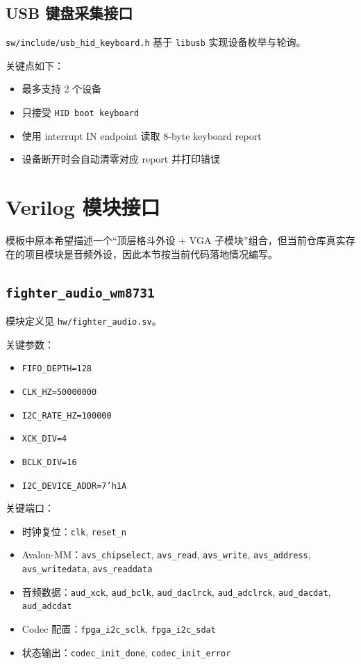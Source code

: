 \documentclass[12pt,a4paper]{ctexart}
\begin{document}
\subsection{USB 键盘采集接口}

\texttt{sw/include/usb\_hid\_keyboard.h} 基于 \texttt{libusb} 实现设备枚举与轮询。

关键点如下：

\begin{itemize}
  \item 最多支持 2 个设备
  \item 只接受 \texttt{HID boot keyboard}
  \item 使用 interrupt IN endpoint 读取 8-byte keyboard report
  \item 设备断开时会自动清零对应 report 并打印错误
\end{itemize}

\section{Verilog 模块接口}

模板中原本希望描述一个“顶层格斗外设 + VGA 子模块”组合，但当前仓库真实存在的项目模块是音频外设，因此本节按当前代码落地情况编写。

\subsection{\texttt{fighter\_audio\_wm8731}}

模块定义见 \texttt{hw/fighter\_audio.sv}。

关键参数：

\begin{itemize}
  \item \texttt{FIFO\_DEPTH=128}
  \item \texttt{CLK\_HZ=50000000}
  \item \texttt{I2C\_RATE\_HZ=100000}
  \item \texttt{XCK\_DIV=4}
  \item \texttt{BCLK\_DIV=16}
  \item \texttt{I2C\_DEVICE\_ADDR=7'h1A}
\end{itemize}

关键端口：

\begin{itemize}
  \item 时钟复位：\texttt{clk}, \texttt{reset\_n}
  \item Avalon-MM：\texttt{avs\_chipselect}, \texttt{avs\_read}, \texttt{avs\_write}, \texttt{avs\_address}, \texttt{avs\_writedata}, \texttt{avs\_readdata}
  \item 音频数据：\texttt{aud\_xck}, \texttt{aud\_bclk}, \texttt{aud\_daclrck}, \texttt{aud\_adclrck}, \texttt{aud\_dacdat}, \texttt{aud\_adcdat}
  \item Codec 配置：\texttt{fpga\_i2c\_sclk}, \texttt{fpga\_i2c\_sdat}
  \item 状态输出：\texttt{codec\_init\_done}, \texttt{codec\_init\_error}
\end{itemize}
\end{document}
